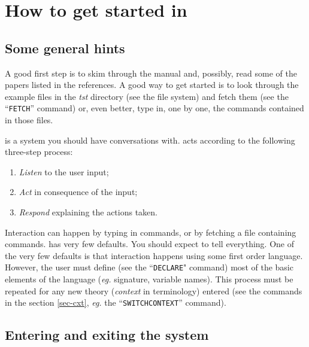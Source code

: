 \section{How to get started in {\GF}}

\subsection{Some general hints}

A good first step is to skim through the manual and, possibly, read some of the
papers listed in the references.
A good way to get started is to look through the example files in the {\it tst}
directory (see the {\GF} file system) and fetch them (see the ``{\tt FETCH}''
command) or, even better, type in, one by one, the commands contained in those files.

{\GF} is a system you should have conversations with.
{\GF} acts according to the following three-step process:
%
\begin{enumerate}
	\item {\it Listen} to the user input;
	\item {\it Act} in consequence of the input;
	\item {\it Respond} explaining the actions taken.
\end{enumerate}
%
Interaction  can happen by typing in commands, or by fetching a file
containing {\GF} commands.
{\GF} has very few defaults.
You should expect to tell {\GF} everything.
One of the very few defaults is that interaction happens using some first order
language.
However, the user must define (see the ``{\tt DECLARE}" command) most of the
basic elements of the language ({\it eg.} signature, variable names).
This process must be repeated for any new theory ({\it context} in {\GF}
terminology) entered (see the commands in the section \ref{sec-cxt}, {\it eg.}
the ``{\tt SWITCHCONTEXT}'' command).



\subsection{Entering and exiting the {\GF} system}
\label{sec-enter}

